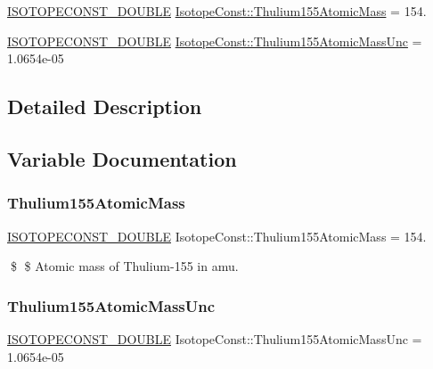 \begin{DoxyCompactItemize}
\item 
\mbox{\hyperlink{group___isotope_const-_macros_ga8f45a7272ce02c0b4c65c44636ed719a}{I\+S\+O\+T\+O\+P\+E\+C\+O\+N\+S\+T\+\_\+\+D\+O\+U\+B\+LE}} \mbox{\hyperlink{group___isotope_const-_thulium-_tm155_ga38340d1df132788b75b117128b16f0e6}{Isotope\+Const\+::\+Thulium155\+Atomic\+Mass}} = 154.
\item 
\mbox{\hyperlink{group___isotope_const-_macros_ga8f45a7272ce02c0b4c65c44636ed719a}{I\+S\+O\+T\+O\+P\+E\+C\+O\+N\+S\+T\+\_\+\+D\+O\+U\+B\+LE}} \mbox{\hyperlink{group___isotope_const-_thulium-_tm155_ga0036d29c6f182fd088b79fe2e0e7f2a8}{Isotope\+Const\+::\+Thulium155\+Atomic\+Mass\+Unc}} = 1.\+0654e-\/05
\end{DoxyCompactItemize}


\subsection{Detailed Description}


\subsection{Variable Documentation}
\mbox{\label{group___isotope_const-_thulium-_tm155_ga38340d1df132788b75b117128b16f0e6}} 
\subsubsection{\texorpdfstring{Thulium155\+Atomic\+Mass}{Thulium155AtomicMass}}
{\footnotesize\ttfamily \mbox{\hyperlink{group___isotope_const-_macros_ga8f45a7272ce02c0b4c65c44636ed719a}{I\+S\+O\+T\+O\+P\+E\+C\+O\+N\+S\+T\+\_\+\+D\+O\+U\+B\+LE}} Isotope\+Const\+::\+Thulium155\+Atomic\+Mass = 154.}

\$ \$ Atomic mass of Thulium-\/155 in amu. \mbox{\label{group___isotope_const-_thulium-_tm155_ga0036d29c6f182fd088b79fe2e0e7f2a8}} 
\subsubsection{\texorpdfstring{Thulium155\+Atomic\+Mass\+Unc}{Thulium155AtomicMassUnc}}
{\footnotesize\ttfamily \mbox{\hyperlink{group___isotope_const-_macros_ga8f45a7272ce02c0b4c65c44636ed719a}{I\+S\+O\+T\+O\+P\+E\+C\+O\+N\+S\+T\+\_\+\+D\+O\+U\+B\+LE}} Isotope\+Const\+::\+Thulium155\+Atomic\+Mass\+Unc = 1.\+0654e-\/05}

